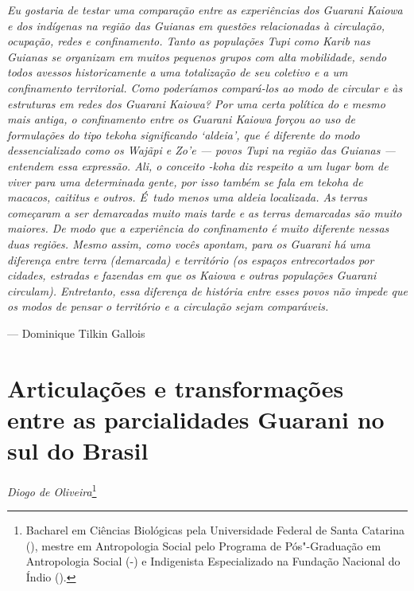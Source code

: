\begin{flushright}
\begin{minipage}[c]{0.85\textwidth}
\raggedleft
\footnotesize
\emph{Eu gostaria de testar uma comparação entre as experiências dos Guarani
Kaiowa e dos indígenas na região das Guianas em questões relacionadas à
circulação, ocupação, redes e confinamento. Tanto as populações Tupi
como Karib nas Guianas se organizam em muitos pequenos grupos com alta
mobilidade, sendo todos avessos historicamente a uma totalização de seu
coletivo e a um confinamento territorial. Como poderíamos compará-los
ao modo de circular e às estruturas em redes dos Guarani Kaiowa? Por
uma certa política do  e mesmo mais antiga, o confinamento entre os
Guarani Kaiowa forçou ao uso de formulações do tipo \emph{tekoha} significando
‘aldeia’, que é diferente do modo dessencializado como os Wajãpi e Zo’e
--- povos Tupi na região das Guianas --- entendem essa expressão. Ali, o
conceito -\emph{koha} diz respeito a um lugar bom de viver para uma
determinada gente, por isso também se fala em \emph{tekoha} de macacos,
caititus e outros. É~tudo menos uma aldeia localizada. As terras
começaram a ser demarcadas muito mais tarde e as terras demarcadas são
muito maiores. De modo que a experiência do confinamento é muito
diferente nessas duas regiões. Mesmo assim, como vocês apontam, para os
Guarani há uma diferença entre terra (demarcada) e território (os
espaços entrecortados por cidades, estradas e fazendas em que os Kaiowa
e outras populações Guarani circulam). Entretanto, essa diferença de
história entre esses povos não impede que os modos de pensar o
território e a circulação sejam comparáveis.}

\smallskip
\hspace*{\fill}--- Dominique Tilkin Gallois
\end{minipage}
\end{flushright}

\thispagestyle{empty}

\chapter*{Articulações e transformações entre as parcialidades Guarani no sul do
Brasil}


\begin{flushright}
\emph{Diogo de Oliveira}\footnote{Bacharel em Ciências Biológicas pela Universidade Federal de Santa Catarina (),
mestre em Antropologia Social pelo Programa de Pós"-Graduação em Antropologia Social (-) e Indigenista
Especializado na Fundação Nacional do Índio ().}
\end{flushright}

